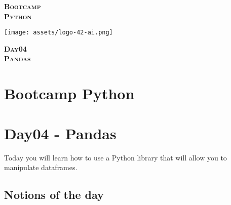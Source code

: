 \documentclass[]{article}
\date{}
\begin{document}

\vspace*{2cm}
\begin{center}
    \textsc{\fontsize{40}{48} \bfseries Bootcamp}\\[0.6cm]
    \textsc{\fontsize{39}{48} \bfseries { %
Python
    }}\\[0.3cm]
\end{center}
\vspace{3cm}

\begin{center}
\texttt{[image: assets/logo-42-ai.png]}{\centering}
\end{center}

\vspace*{2cm}
\begin{center}
    \textsc{\fontsize{32}{48} \bfseries %
Day04    
    }\\[0.6cm]
    \textsc{\fontsize{32}{48} \bfseries %
Pandas    
    }\\[0.3cm]
\end{center}
\vspace{3cm}

\newpage

\setcounter{page}{1}



\hypertarget{bootcamp-python}{%
\section{Bootcamp Python}\label{bootcamp-python}}

\hypertarget{day04---pandas}{%
\section{Day04 - Pandas}\label{day04---pandas}}

Today you will learn how to use a Python library that will allow you to
manipulate dataframes.

\hypertarget{notions-of-the-day}{%
\subsection{Notions of the day}\label{notions-of-the-day}}
\end{document}
